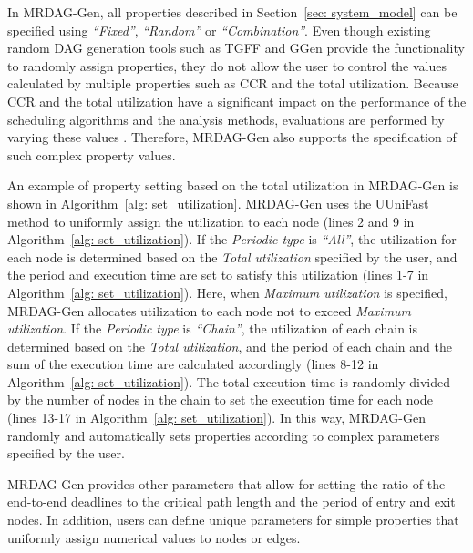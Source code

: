 In MRDAG-Gen, all properties described in Section~\ref{sec: system_model} can be specified using {\it “Fixed”}, {\it “Random”} or {\it “Combination”}.
Even though existing random DAG generation tools such as TGFF and GGen provide the functionality to randomly assign properties, they do not allow the user to control the values calculated by multiple properties such as CCR and the total utilization.
Because CCR and the total utilization have a significant impact on the performance of the scheduling algorithms and the analysis methods, evaluations are performed by varying these values \cite{he2021response, agrawal2020hard, senapati2021hmds, sulaiman2021hybrid}.
Therefore, MRDAG-Gen also supports the specification of such complex property values.

An example of property setting based on the total utilization in MRDAG-Gen is shown in Algorithm~\ref{alg: set_utilization}.
MRDAG-Gen uses the UUniFast method \cite{bini2005measuring} to uniformly assign the utilization to each node (lines 2 and 9 in Algorithm~\ref{alg: set_utilization}).
If the {\it Periodic type} is {\it “All”}, the utilization for each node is determined based on the {\it Total utilization} specified by the user, and the period and execution time are set to satisfy this utilization (lines 1-7 in Algorithm~\ref{alg: set_utilization}).
Here, when {\it Maximum utilization} is specified, MRDAG-Gen allocates utilization to each node not to exceed {\it Maximum utilization}.
If the {\it Periodic type} is {\it “Chain”}, the utilization of each chain is determined based on the {\it Total utilization}, and the period of each chain and the sum of the execution time are calculated accordingly (lines 8-12 in Algorithm~\ref{alg: set_utilization}).
The total execution time is randomly divided by the number of nodes in the chain to set the execution time for each node (lines 13-17 in Algorithm~\ref{alg: set_utilization}).
In this way, MRDAG-Gen randomly and automatically sets properties according to complex parameters specified by the user.

MRDAG-Gen provides other parameters that allow for setting the ratio of the end-to-end deadlines to the critical path length and the period of entry and exit nodes.
In addition, users can define unique parameters for simple properties that uniformly assign numerical values to nodes or edges.
